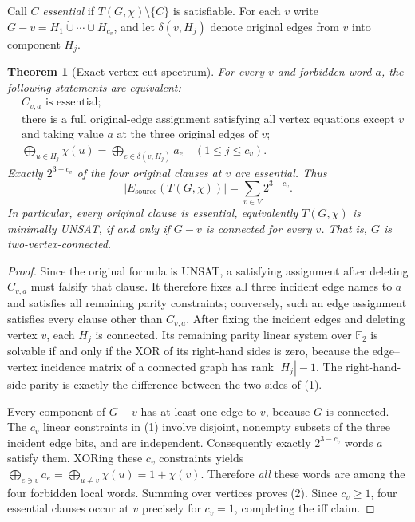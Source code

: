 \documentclass[11pt]{article}
\newtheorem{theorem}{Theorem}
\begin{document}
Call $C$ \emph{essential} if $T(G,\chi)\setminus\{C\}$ is satisfiable.  For each $v$ write $G-v=H_1\dot\cup\cdots\dot\cup H_{c_v}$, and let $\delta(v,H_j)$ denote original edges from $v$ into component $H_j$.
\begin{theorem}[Exact vertex-cut spectrum]\label{th:cut}
For every $v$ and forbidden word $a$, the following statements are equivalent:
\[
\begin{split}
&C_{v,a}\text{ is essential};\\[-2mm]
&\text{there is a full original-edge assignment satisfying all vertex equations except }v\\[-2mm]
&\text{and taking value }a\text{ at the three original edges of }v;\\[-2mm]
&\bigoplus_{u\in H_j}\chi(u)=\bigoplus_{e\in\delta(v,H_j)}a_e\quad(1\le j\le c_v).
\end{split}\tag{1}
\]
Exactly $2^{3-c_v}$ of the four original clauses at $v$ are essential.  Thus
\[
\boxed{|E_{\mathrm{source}}(T(G,\chi))|=\sum_{v\in V}2^{3-c_v}.}\tag{2}
\]
In particular, \emph{every} original clause is essential, equivalently $T(G,\chi)$ is minimally UNSAT, if and only if $G-v$ is connected for every $v$.  That is, $G$ is two-vertex-connected.
\end{theorem}
\begin{proof}
Since the original formula is UNSAT, a satisfying assignment after deleting $C_{v,a}$ must falsify that clause.  It therefore fixes all three incident edge names to $a$ and satisfies all remaining parity constraints; conversely, such an edge assignment satisfies every clause other than $C_{v,a}$.  After fixing the incident edges and deleting vertex $v$, each $H_j$ is connected.  Its remaining parity linear system over $\mathbb F_2$ is solvable if and only if the XOR of its right-hand sides is zero, because the edge--vertex incidence matrix of a connected graph has rank $|H_j|-1$.  The right-hand-side parity is exactly the difference between the two sides of (1).

Every component of $G-v$ has at least one edge to $v$, because $G$ is connected.  The $c_v$ linear constraints in (1) involve disjoint, nonempty subsets of the three incident edge bits, and are independent.  Consequently exactly $2^{3-c_v}$ words $a$ satisfy them.  XORing these $c_v$ constraints yields
$\bigoplus_{e\ni v}a_e=\bigoplus_{u\ne v}\chi(u)=1+\chi(v)$.
Therefore \emph{all} these words are among the four forbidden local words.  Summing over vertices proves (2).  Since $c_v\ge1$, four essential clauses occur at $v$ precisely for $c_v=1$, completing the iff claim.
\end{proof}
\end{document}
